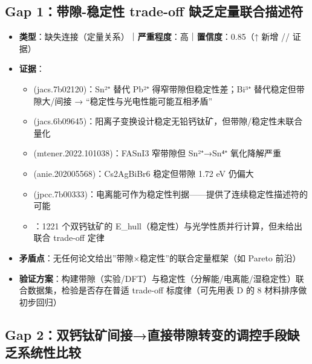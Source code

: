 \documentclass[12pt,a4paper]{ctexart}
\providecommand{\tightlist}{%
  \setlength{\itemsep}{0pt}\setlength{\parskip}{0pt}}
\begin{document}
\subsection{Gap 1：带隙-稳定性 trade-off 缺乏定量联合描述符}\label{gap:gap-1ux5e26ux9699-ux7a33ux5b9aux6027-trade-off-ux7f3aux4e4fux5b9aux91cfux8054ux5408ux63cfux8ff0ux7b26}

\begin{itemize}
\tightlist
\item
  \textbf{类型}：缺失连接（定量关系）｜\textbf{严重程度}：高｜\textbf{置信度}：0.85（↑ 新增 \cite{p50}/\cite{p57}/\cite{p65} 证据）
\item
  \textbf{证据}：

  \begin{itemize}
  \tightlist
  \item
    \cite{p6} (jacs.7b02120)：Sn²⁺ 替代 Pb²⁺ 得窄带隙但稳定性差；Bi³⁺ 替代稳定但带隙大/间接 → ``稳定性与光电性能可能互相矛盾''
  \item
    \cite{p8} (jacs.6b09645)：阳离子变换设计稳定无铅钙钛矿，但带隙/稳定性未联合量化
  \item
    \cite{p34} (mtener.2022.101038)：FASnI3 窄带隙但 Sn²⁺→Sn⁴⁺ 氧化降解严重
  \item
    \cite{p14} (anie.202005568)：Cs2AgBiBr6 稳定但带隙 1.72 eV 仍偏大
  \item
    \cite{p50} (jpcc.7b00333)：电离能可作为稳定性判据------提供了连续稳定性描述符的可能
  \item
    \cite{p65}：1221 个双钙钛矿的 E\_hull（稳定性）与光学性质并行计算，但未给出联合 trade-off 定律
  \end{itemize}
\item
  \textbf{矛盾点}：无任何论文给出''带隙×稳定性''的联合定量框架（如 Pareto 前沿）
\item
  \textbf{验证方案}：构建带隙（实验/DFT）与稳定性（分解能/电离能/湿稳定性）联合数据集，检验是否存在普适 trade-off 标度律（可先用表 D 的 8 材料排序做初步回归）
\end{itemize}

\subsection{Gap 2：双钙钛矿间接→直接带隙转变的调控手段缺乏系统性比较}\label{gap:gap-2ux53ccux9499ux949bux77ffux95f4ux63a5ux76f4ux63a5ux5e26ux9699ux8f6cux53d8ux7684ux8c03ux63a7ux624bux6bb5ux7f3aux4e4fux7cfbux7edfux6027ux6bd4ux8f83}
\end{document}
